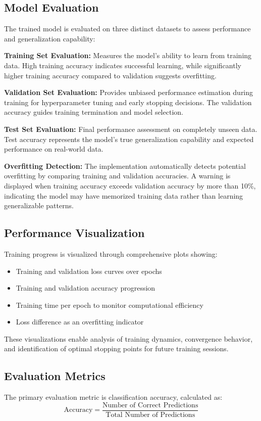 \documentclass[conference]{IEEEtran}
\begin{document}
\subsection{Model Evaluation}
The trained model is evaluated on three distinct datasets to assess performance and generalization capability:

\textbf{Training Set Evaluation:} Measures the model's ability to learn from training data. High training accuracy indicates successful learning, while significantly higher training accuracy compared to validation suggests overfitting.

\textbf{Validation Set Evaluation:} Provides unbiased performance estimation during training for hyperparameter tuning and early stopping decisions. The validation accuracy guides training termination and model selection.

\textbf{Test Set Evaluation:} Final performance assessment on completely unseen data. Test accuracy represents the model's true generalization capability and expected performance on real-world data.

\textbf{Overfitting Detection:} The implementation automatically detects potential overfitting by comparing training and validation accuracies. A warning is displayed when training accuracy exceeds validation accuracy by more than 10\%, indicating the model may have memorized training data rather than learning generalizable patterns.

\subsection{Performance Visualization}
Training progress is visualized through comprehensive plots showing:
\begin{itemize}
\item Training and validation loss curves over epochs
\item Training and validation accuracy progression
\item Training time per epoch to monitor computational efficiency
\item Loss difference as an overfitting indicator
\end{itemize}

These visualizations enable analysis of training dynamics, convergence behavior, and identification of optimal stopping points for future training sessions.

\subsection{Evaluation Metrics}
The primary evaluation metric is classification accuracy, calculated as:
\begin{equation}
\text{Accuracy} = \frac{\text{Number of Correct Predictions}}{\text{Total Number of Predictions}}
\end{equation}
\end{document}
